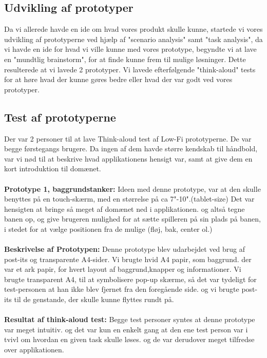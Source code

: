 \subsection*{Udvikling af prototyper}
Da vi allerede havde en ide om hvad vores produkt skulle kunne, startede vi vores udvikling af prototyperne ved hjælp af "scenario analysis" samt "task analysis", da vi havde en ide for hvad vi ville kunne med vores prototype, begyndte vi at lave en "mundtlig brainstorm", for at finde kunne frem til mulige løsninger. Dette resulterede at vi lavede 2 prototyper. Vi lavede efterfølgende "think-aloud" tests for at høre hvad der kunne gøres bedre eller hvad der var godt ved vores prototyper.

\subsection*{Test af prototyperne}
Der var 2 personer til at lave Think-aloud test af Low-Fi prototyperne. De var begge førstegangs brugere. Da ingen af dem havde større kendskab til håndbold, var vi nød til at beskrive hvad applikationens hensigt var, samt at give dem en kort introduktion til domænet.\\\\ \textbf{Prototype 1, baggrundstanker:}
Ideen med denne prototype, var at den skulle benyttes på en touch-skærm, med en størrelse på ca 7"-10".(tablet-size)
Det var hensigten at bringe så meget af domænet ned i applikationen. og altså tegne banen op, og give brugeren mulighed for at sætte spilleren på sin plads på banen, i stedet for at vælge positionen fra de mulige (fløj, bak, center ol.)\\\\ \textbf{Beskrivelse af Prototypen:} Denne prototype blev udarbejdet ved brug af post-its og transparente A4-sider. Vi brugte hvid A4 papir, som baggrund. der var et ark papir, for hvert layout af baggrund,knapper og informationer.
Vi brugte transparent A4, til at symbolisere pop-up skærme, så det var tydeligt for test-personen at han ikke blev fjernet fra den foregående side.
og vi brugte post-its til de genstande, der skulle kunne flyttes rundt på.\\\\\textbf{Resultat af think-aloud test:} Begge test personer syntes at denne prototype var meget intuitiv. og det var kun en enkelt gang at den ene test person var i tvivl om hvordan en given task skulle løses. og de var derudover meget tilfredse over applikationen.
